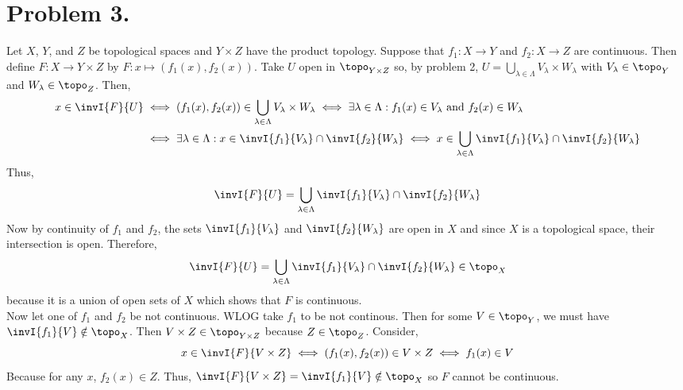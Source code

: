 \documentclass[12pt]{extarticle}
\begin{document}
\section*{Problem 3.}
Let $X$, $Y$, and $Z$ be topological spaces and $Y \times Z$ have the product topology. Suppose that $f_1 : X \rightarrow Y$ and $f_2 : X \rightarrow Z$ are continuous. Then define $F : X \rightarrow Y \times Z$ by $F : x \mapsto (f_1(x), f_2(x))$. Take $U$ open in $\topo_{Y \times Z}$ so, by problem 2, $U = \bigcup\limits_{\lambda \in \Lambda} V_\lambda \times W_\lambda$ with $V_\lambda \in \topo_Y$ and $W_\lambda \in \topo_Z$. Then, 
\begin{align*}
x \in \invI{F}{U} & \iff (f_1(x), f_2(x)) \in \bigcup\limits_{\lambda \in \Lambda} V_\lambda \times W_\lambda \iff \exists \lambda \in \Lambda : f_1(x) \in V_\lambda \text{ and } f_2(x) \in W_\lambda \\ & \iff \exists \lambda \in \Lambda : x \in \invI{f_1}{V_\lambda} \cap \invI{f_2}{W_\lambda} \iff x \in \bigcup_{\lambda \in \Lambda} \invI{f_1}{V_\lambda} \cap \invI{f_2}{W_\lambda}  
\end{align*}
Thus, \[\invI{F}{U} = \bigcup\limits_{\lambda \in \Lambda} \invI{f_1}{V_\lambda} \cap \invI{f_2}{W_\lambda}\]
Now by continuity of $f_1$ and $f_2$, the sets $\invI{f_1}{V_\lambda}$ and $\invI{f_2}{W_\lambda}$ are open in $X$ and since $X$ is a topological space, their intersection is open.
Therefore, \[\invI{F}{U} = \bigcup\limits_{\lambda \in \Lambda} \invI{f_1}{V_\lambda} \cap \invI{f_2}{W_\lambda} \in \topo_X\] because it is a union of open sets of $X$ which shows that $F$ is continuous.
\bigskip \\
Now let one of $f_1$ and $f_2$ be not continuous. WLOG take $f_1$ to be not continous. Then for some $V \in \topo_Y$, we must have $\invI{f_1}{V} \notin \topo_X$. Then $V \times Z \in \topo_{Y \times Z}$ because $Z \in \topo_Z$. Consider, \[x \in \invI{F}{V \times Z} \iff (f_1(x), f_2(x)) \in V \times Z \iff f_1(x) \in V\]
Because for any $x$, $f_2(x) \in Z$. Thus, $\invI{F}{V \times Z} = \invI{f_1}{V} \notin \topo_X$ so $F$ cannot be continuous. 
\end{document}
